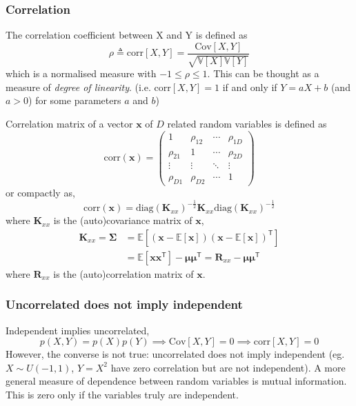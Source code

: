 \documentclass[11pt]{article}
\begin{document}
\subsubsection*{Correlation}
The correlation coefficient between X and Y is defined as
\[
\rho \triangleq \text{corr}[X, Y] = \frac{\text{Cov}[X, Y]}{\sqrt{\mathbb{V}[X] \mathbb{V}[Y]}}
\]
which is a normalised measure with $-1 \leq \rho \leq 1$. This can be thought as a measure of \textit{degree of linearity}.
(i.e. corr$[X,Y] = 1$ if and only if $Y = aX+ b$ (and $a>0$) for some parameters $a$ and $b$)

Correlation matrix of a vector $\boldsymbol{x}$ of $D$ related random variables is defined as
\[
\text{corr}(\boldsymbol{x}) = \begin{pmatrix}
    1 & \rho_{12} & \cdots & \rho_{1D} \\
    \rho_{21} & 1 & \cdots & \rho_{2D} \\
    \vdots & \vdots & \ddots & \vdots \\
    \rho_{D1} & \rho_{D2} & \cdots & 1
\end{pmatrix}
\]
or compactly as,
\[
\text{corr}(\boldsymbol{x}) = \text{diag}(\boldsymbol{K}_{xx})^{-\frac{1}{2}} \boldsymbol{K}_{xx} \text{diag}(\boldsymbol{K}_{xx})^{-\frac{1}{2}}
\]
where $\boldsymbol{K}_{xx}$ is the (auto)covariance matrix of $\boldsymbol{x}$,
\[
\begin{aligned}
\boldsymbol{K}_{xx} = \boldsymbol{\Sigma} &= \mathbb{E} \left[ (\boldsymbol{x} - \mathbb{E}[\boldsymbol{x}])(\boldsymbol{x} - \mathbb{E}[\boldsymbol{x}])^\mathsf{T} \right] \\
&= \mathbb{E}[\boldsymbol{x} \boldsymbol{x}^\mathsf{T}] - \boldsymbol{\mu} \boldsymbol{\mu}^\mathsf{T} = \boldsymbol{R}_{xx} - \boldsymbol{\mu} \boldsymbol{\mu}^\mathsf{T}
\end{aligned}
\]
where $\boldsymbol{R}_{xx}$ is the (auto)correlation matrix of $\boldsymbol{x}$.

\subsubsection*{Uncorrelated does not imply independent}
Independent implies uncorrelated,
\[
p(X, Y) = p(X)p(Y) \implies \text{Cov}[X, Y] = 0 \implies \text{corr}[X, Y] = 0
\]
However, the converse is not true: uncorrelated does not imply independent (eg. $X \sim U(-1,1)$, $Y = X^2$ have zero correlation but are not independent). 
A more general measure of dependence between random variables is mutual information. 
This is zero only if the variables truly are independent.
\end{document}
